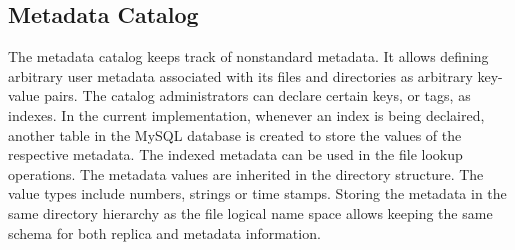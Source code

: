 \subsection{Metadata Catalog}

The metadata catalog keeps track of nonstandard metadata. It allows defining arbitrary user metadata 
associated with its files and directories as arbitrary key-value pairs. The catalog administrators can 
declare certain keys, or tags, as indexes. In the current implementation, whenever an index is being declaired, 
another table in the MySQL database is created to store the values of the respective metadata. The indexed 
metadata can be used in the file lookup operations. The metadata values are inherited in the directory structure.
The value types include numbers, strings or time stamps. Storing the metadata in the same directory hierarchy 
as the file logical name space allows keeping the same schema for both replica and metadata information.